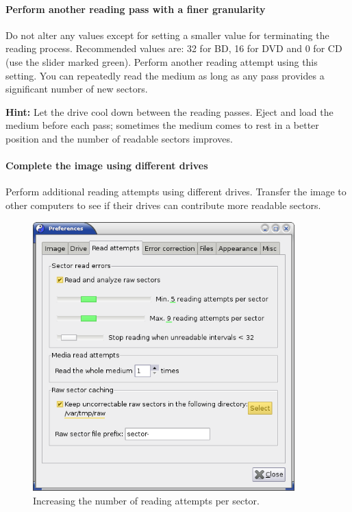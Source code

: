 \vspace*{-10mm}
\paragraph{Perform another reading pass with a finer granularity}\quad

Do not alter any values except for setting a smaller value for terminating
the reading process. Recommended values are: 32 for BD, 16 for DVD and 0
for CD (use the slider marked green). Perform another reading attempt
using this setting. You can repeatedly read the medium as long as any
pass provides a significant number of new sectors.

\smallskip

{\bf Hint:} Let the drive cool down between the reading passes.
Eject and load the medium before each pass; sometimes the medium
comes to rest in a better position and the number of readable sectors improves. 

\vspace*{-3mm}
\paragraph{Complete the image using different drives}\quad

Perform additional reading attempts using different drives.
Transfer the image to other computers to see if their drives
can contribute more readable sectors.

\newpage

\begin{figure}[h]
\centerline{\includegraphics[width=0.9\textwidth]{screenshots/fix-prefs-read-attempts-adv2.png}}
\caption{Increasing the number of reading attempts per sector.}  
\label{howto-recover-read-attempts-per-sector}
\end{figure}

